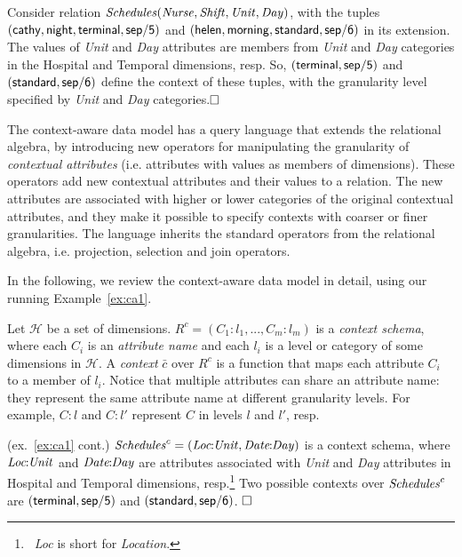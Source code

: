 \documentclass[format=acmsmall, review=false, screen=true]{acmart}
\newcommand{\boxtheorem}{\ensuremath{\hfill \Box}}
\newcommand{\mc}[1]{\mathcal{ #1}}
\newcommand{\nit}[1]{{\it #1}}
\newcommand{\vectt}[1]{\bar{#1}}
\begin{document}
{\begin{example} \label{ex:ca1} Consider relation $\nit{Schedules}(\nit{Nurse},\nit{Shift},\nit{Unit},\nit{Day})$, with the tuples $({\sf cathy},{\sf night},{\sf terminal},{\sf sep/5})$ and $({\sf helen},{\sf morning},{\sf standard},{\sf sep/6})$ in its extension. The values of \nit{Unit} and \nit{Day} attributes are members from \nit{Unit} and \nit{Day} categories in the {\sf Hospital} and {\sf Temporal} dimensions, resp. So, $({\sf terminal},{\sf sep/5})$ and $({\sf standard}, {\sf sep/6})$ define the context of these tuples, with the granularity level specified by \nit{Unit} and \nit{Day} categories.\boxtheorem \end{example}

The context-aware data model has a query language that extends the relational algebra, by introducing new operators for manipulating the granularity of {\em contextual attributes} (i.e. attributes with values as members of dimensions). These operators add new contextual attributes and their values to a relation. The new attributes are associated with higher or lower categories of the original contextual attributes, and they make it possible to specify contexts with coarser or finer granularities. The language inherits the standard operators from the relational algebra, i.e. projection, selection and join operators.

In the following, we review the context-aware data model in detail, using our running Example~\ref{ex:ca1}.

Let $\mc{H}$ be a set of dimensions. $R^c=(C_1\!:\!l_1,...,C_m\!:\!l_m)$ is a {\em context schema}, where each $C_i$ is an {\em attribute name} and each $l_i$ is a level or category of some dimensions in $\mc{H}$. A {\em context} $\vectt{c}$ over $R^c$ is a function that maps each attribute $C_i$ to a member of $l_i$. Notice that multiple attributes can share an attribute name: they represent the same attribute name at different granularity levels. For example, $C:l$ and $C:l'$ represent $C$ in levels $l$ and $l'$, resp.

\begin{example} \label{ex:ca2} (ex.~\ref{ex:ca1} cont.) $\nit{Schedules}^c=(\nit{Loc}\!\!:\!\!\nit{Unit},\nit{Date}\!\!:\!\!\nit{Day})$ is a context schema, where $\nit{Loc}\!\!:\!\!\nit{Unit}$ and $\nit{Date}\!\!:\!\!\nit{Day}$ are attributes associated with \nit{Unit} and \nit{Day} attributes in {\sf Hospital} and {\sf Temporal} dimensions, resp.\footnote{\ \nit{Loc} is short for \nit{Location}.} Two possible contexts over $\nit{Schedules}^c$ are $({\sf terminal},{\sf sep/5})$ and $({\sf standard},{\sf sep/6})$. \boxtheorem \end{example}

}
\end{document}
